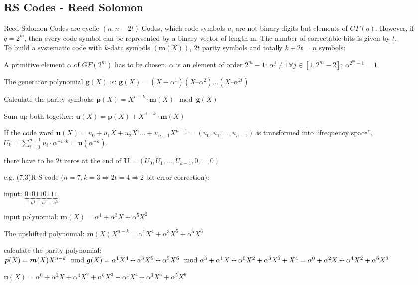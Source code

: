 \subsection{RS Codes - Reed Solomon}
Reed-Salomon Codes are cyclic $(n, n-2t)$-Codes, which code symbols $u_i$ are not binary digits but elements of $GF(q)$. However, if $q=2^m$, then every code symbol
can be represented by a binary vector of length m. The number of correctable bits is given by $t$.\\


To build a systematic code with $k$-data symbols $(\bm m(X))$, $2t$ parity symbols and totally $k+2t=n$ symbols:
\begin{liste}
\item A primitive element $\alpha$ of $GF(2^m)$ has to be chosen. 
$\alpha$ is an element of order $2^m-1$: $\alpha^j\neq 1 \forall j\in [1,2^m-2]$; $\alpha^{2^m-1}=1$
\item The generator polynomial $\bm g(X)$ is:  $\bm g(X)=(X - \alpha^1) (X – \alpha^2)\ldots (X – \alpha^{2t})$
\item Calculate the parity symbols: $\bm p(X)=X^{n-k}\cdot \bm m(X) \mod \bm g(X)$
\item Sum up both together: $\bm u(X)=\bm p(X) +X^{n-k}\cdot \bm m(X) $
\item If the code word $\bm u(X) = u_0 + u_1 X+u_2 X^2\ldots+u_{n-1}X^{n-1} = ( u_0,  u_1, \ldots,  u_{n-1})$ is transformed into ``frequency space'', 
$U_k = \sum\limits_{i=0}^{n-1} u_i\cdot \alpha^{-i\cdot k}=\bm u(\alpha^{-k})$.
\item there have to be $2t$ zeros at the end of $\bm U=(U_0,U_1,\ldots,U_{k-1},0,\ldots,0)$
\end{liste}
e.g. (7,3)R-S code $(n=7, k=3 \Rightarrow 2t=4 \Rightarrow 2$ bit error correction$)$:
\begin{liste}
\item input: $\underbrace{010}_{\equiv a^1} \underbrace{110}_{\equiv a^3} \underbrace{111}_{\equiv a^5}$
\item input polynomial: $\bm m(X)=\alpha^1 + \alpha^3 X + \alpha^5 X^2$ 
\item The upshifted polynomial: $\bm m(X) X^{n-k}=\alpha^1 X^4 + \alpha^3 X^5 + \alpha^5 X^6$
\item calculate the parity polynomial: $\bm p(X)=\bm m(X) X^{n-k} \mod \bm g(X)\\
= \alpha^1 X^4 + \alpha^3 X^5 + \alpha^5 X^6 \mod \alpha^3 + \alpha^1 X + \alpha^0 X^2+\alpha^3 X^3+ X^4=\alpha^0+\alpha^2 X+\alpha^4 X^2 + \alpha^6 X^3$
\item $\bm u(X)=\alpha^0 + \alpha^2 X + \alpha^4 X^2 + \alpha^6 X^3+ \alpha^1 X^4 + \alpha^3 X^5 + \alpha^5 X^6$
\end{liste}
